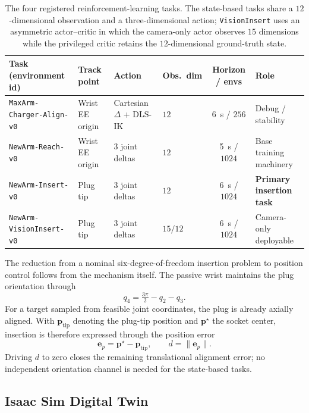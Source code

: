 \begin{table}[!ht]
\centering
\caption{The four registered reinforcement-learning tasks. The state-based tasks share a $12$-dimensional observation and a three-dimensional action; \texttt{VisionInsert} uses an asymmetric actor--critic in which the camera-only actor observes $15$ dimensions while the privileged critic retains the $12$-dimensional ground-truth state.}
\label{rl:tab:rl-tasks}
\scriptsize
\setlength{\tabcolsep}{2pt}
\begin{tabular}{@{}llllcl@{}}
\toprule
Task (environment id) & Track point & Action & Obs.\ dim & Horizon / envs & Role \\
\midrule
\texttt{MaxArm-Charger-Align-v0} & Wrist EE origin & Cartesian $\Delta$ + DLS-IK & $12$    & \SI{6}{\second} / $256$  & Debug / stability \\
\texttt{NewArm-Reach-v0}         & Wrist EE origin & $3$ joint deltas          & $12$    & \SI{5}{\second} / $1024$ & Base training machinery \\
\texttt{NewArm-Insert-v0}        & Plug tip        & $3$ joint deltas          & $12$    & \SI{6}{\second} / $1024$ & \textbf{Primary insertion task} \\
\texttt{NewArm-VisionInsert-v0}  & Plug tip        & $3$ joint deltas          & $15/12$ & \SI{6}{\second} / $1024$ & Camera-only deployable \\
\bottomrule
\end{tabular}
\end{table}

The reduction from a nominal six-degree-of-freedom insertion problem to position control follows from the mechanism itself. The passive wrist maintains the plug orientation through
\begin{equation*}
q_4=\tfrac{3\pi}{2}-q_2-q_3 .
\end{equation*}
For a target sampled from feasible joint coordinates, the plug is already axially aligned. With $\bm{p}_{\mathrm{tip}}$ denoting the plug-tip position and $\bm{p}^{\star}$ the socket center, insertion is therefore expressed through the position error
\begin{equation*}
\bm{e}_p=\bm{p}^{\star}-\bm{p}_{\mathrm{tip}},\qquad d=\lVert\bm{e}_p\rVert .
\end{equation*}
Driving $d$ to zero closes the remaining translational alignment error; no independent orientation channel is needed for the state-based tasks.

\rlFloatBarrier

\subsection{Isaac Sim Digital Twin}\label{rl:sec:rl-twin}

